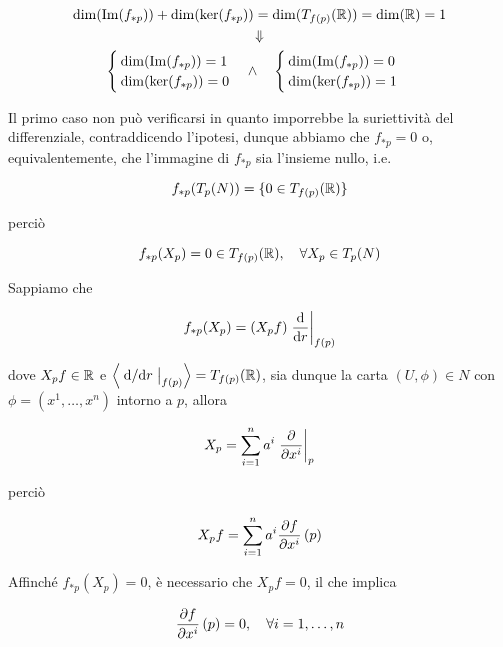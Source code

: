 \begin{gather}
	\dim(\Im(f_{*p})) + \dim(\ker(f_{*p})) = \dim(T_{f(p)}(\R)) = \dim(\R) = 1 \\%
	\Downarrow \nonumber \\%
	\begin{cases}
		\dim(\Im(f_{*p})) = 1\\
		\dim(\ker(f_{*p})) = 0
	\end{cases} %
	\wedge \quad
	\begin{cases}
		\dim(\Im(f_{*p})) = 0\\
		\dim(\ker(f_{*p})) = 1
	\end{cases}
\end{gather}

Il primo caso non può verificarsi in quanto imporrebbe la suriettività del differenziale, contraddicendo l'ipotesi, dunque abbiamo che $ f_{*p} = 0 $ o, equivalentemente, che l'immagine di $ f_{*p} $ sia l'insieme nullo, i.e.

\begin{equation}
	f_{*p}(T_{p}(N)) = \{0 \in T_{f(p)}(\mathbb{R})\}
\end{equation}

perciò

\begin{equation}
	f_{*p}(X_{p}) = 0 \in T_{f(p)}(\R) \qcomma \forall X_{p} \in T_{p}(N)
\end{equation}

Sappiamo che

\begin{equation}
	f_{*p}(X_{p}) = (X_{p} f) \eval{ \dv{r} }_{f(p)}
\end{equation}

dove $ X_{p} f \in \mathbb{R} $ e $ \ev{ \eval{ \dv*{r} }_{f(p)} } = T_{f(p)}(\R) $, sia dunque la carta $ (U,\phi) \in N $ con $ \phi = (x^{1},\dots,x^{n}) $ intorno a $ p $, allora

\begin{equation}
	X_{p} = \sum_{i=1}^{n} a^{i} \eval{ \pdv{x^{i}} }_{p}
\end{equation}

perciò

\begin{equation}
	X_{p} f = \sum_{i=1}^{n} a^{i} \pdv{f}{x^{i}} \, (p)
\end{equation}

Affinché $ f_{*p}(X_{p}) = 0 $, è necessario che $ X_{p} f = 0 $, il che implica

\begin{equation}
	\pdv{f}{x^{i}} \, (p) = 0 \qcomma \forall i=1,\dots,n
\end{equation}

